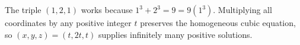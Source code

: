 The triple $(1,2,1)$ works because $1^3+2^3=9=9(1^3)$. Multiplying all coordinates by any positive integer $t$ preserves the homogeneous cubic equation, so $\boxed{(x,y,z)=(t,2t,t)}$ supplies infinitely many positive solutions.
